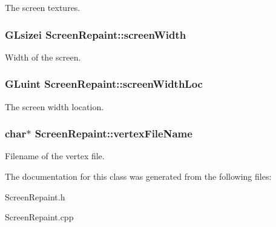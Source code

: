 The screen textures. \hypertarget{class_screen_repaint_a547abbfc913fe100639bd66b350991db}{
\subsubsection[{screen\-Width}]{\setlength{\rightskip}{0pt plus 5cm}G\-Lsizei {\bf Screen\-Repaint\-::screen\-Width}}}\label{class_screen_repaint_a547abbfc913fe100639bd66b350991db}
Width of the screen. \hypertarget{class_screen_repaint_a82bc1f48111a3e7a71abdd5dbce3b3e3}{
\subsubsection[{screen\-Width\-Loc}]{\setlength{\rightskip}{0pt plus 5cm}G\-Luint {\bf Screen\-Repaint\-::screen\-Width\-Loc}}}\label{class_screen_repaint_a82bc1f48111a3e7a71abdd5dbce3b3e3}
The screen width location. \hypertarget{class_screen_repaint_a7052a5a8a1d72dcdff0268179a3f54ab}{
\subsubsection[{vertex\-File\-Name}]{\setlength{\rightskip}{0pt plus 5cm}char$\ast$ {\bf Screen\-Repaint\-::vertex\-File\-Name}}}\label{class_screen_repaint_a7052a5a8a1d72dcdff0268179a3f54ab}
Filename of the vertex file. 

The documentation for this class was generated from the following files\-:\begin{DoxyCompactItemize}
\item 
Screen\-Repaint.\-h\item 
Screen\-Repaint.\-cpp\end{DoxyCompactItemize}
